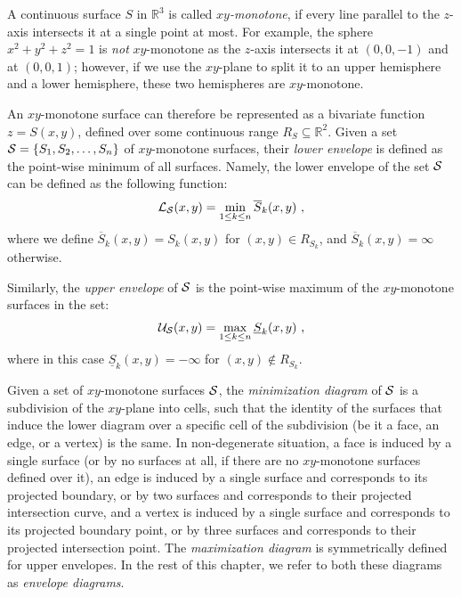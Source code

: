 
A continuous surface $S$ in ${\mathbb R}^3$ is called {\em $xy$-monotone},
if every line parallel to the $z$-axis intersects it at a single point
at most. For example, the sphere $x^2 + y^2 + z^2 = 1$ is {\em not}
$xy$-monotone as the $z$-axis intersects it at $(0, 0, -1)$ and at
$(0, 0, 1)$; however, if we use the $xy$-plane to split it to an
upper hemisphere and a lower hemisphere, these two hemispheres are
$xy$-monotone.

An $xy$-monotone surface can therefore be represented as a
bivariate function $z = S(x,y)$, defined over some continuous range
$R_S \subseteq {\mathbb R}^2$. Given a set 
${\cal S} = \{ S_1, S_2, \ldots, S_n \}$ of $xy$-monotone surfaces,
their {\em lower envelope} is defined
as the point-wise minimum of all surfaces. Namely, the lower envelope
of the set ${\cal S}$ can be defined as the following function:
\begin{eqnarray*}
{\cal L}_{{\cal S}} (x,y) = \min_{1 \leq k \leq n}{\overline{S}_k (x,y)} \ ,
\end{eqnarray*}
where we define $\overline{S}_k(x,y) = S_k(x,y)$ for $(x,y) \in R_{S_k}$, and 
$\overline{S}_k(x,y) = \infty$ otherwise.

Similarly, the {\em upper envelope} of ${\cal S}$ is the point-wise maximum of
the $xy$-monotone surfaces in the set:
\begin{eqnarray*}
{\cal U}_{{\cal S}} (x,y) = \max_{1 \leq k \leq n}{\underline{S}_k (x,y)} \ ,
\end{eqnarray*}
where in this case $\underline{S}_k(x,y) = -\infty$ for $(x,y) \not\in
R_{S_k}$.

Given a set of $xy$-monotone surfaces ${\cal S}$, the {\em minimization
diagram} of ${\cal S}$ is a subdivision of the $xy$-plane into cells,
such that the identity of the surfaces that induce the lower diagram
over a specific cell of the subdivision (be it a face, an edge, or
a vertex) is the same. In non-degenerate situation, a face is
induced by a single surface (or by no surfaces at all, if there are
no $xy$-monotone surfaces defined over it), an edge is induced by a 
single surface and corresponds to its projected boundary, or by two 
surfaces and corresponds to their projected intersection curve, and
a vertex is induced by a single surface and corresponds to its projected 
boundary point, or by three surfaces and corresponds to their projected 
intersection point. The {\em maximization diagram} is symmetrically 
defined for upper envelopes. In the rest of this chapter, we refer to 
both these diagrams as {\em envelope diagrams}.

